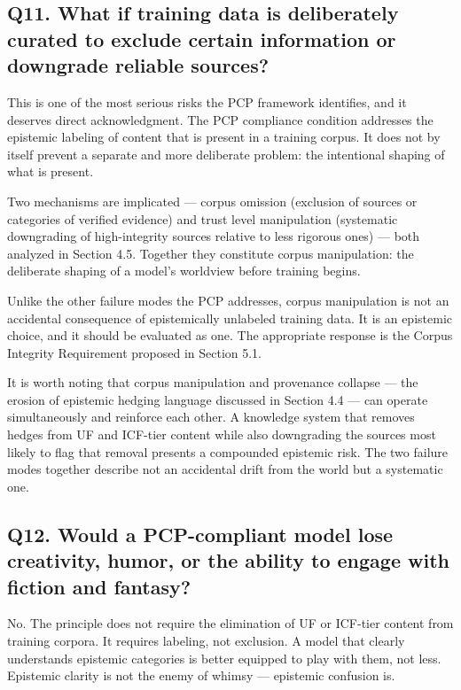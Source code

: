 \documentclass[12pt]{article}
\begin{document}
\subsection{Q11. What if training data is deliberately curated to
exclude certain information or downgrade reliable
sources?}\label{q11.-what-if-training-data-is-deliberately-curated-to-exclude-certain-information-or-downgrade-reliable-sources}

This is one of the most serious risks the PCP framework identifies, and
it deserves direct acknowledgment. The PCP compliance condition
addresses the epistemic labeling of content that is present in a
training corpus. It does not by itself prevent a separate and more
deliberate problem: the intentional shaping of what is present.

Two mechanisms are implicated --- corpus omission (exclusion of sources
or categories of verified evidence) and trust level manipulation
(systematic downgrading of high-integrity sources relative to less
rigorous ones) --- both analyzed in Section 4.5. Together they
constitute corpus manipulation: the deliberate shaping of a model's
worldview before training begins.

Unlike the other failure modes the PCP addresses, corpus manipulation is
not an accidental consequence of epistemically unlabeled training data.
It is an epistemic choice, and it should be evaluated as one. The
appropriate response is the Corpus Integrity Requirement proposed in
Section 5.1.

It is worth noting that corpus manipulation and provenance collapse ---
the erosion of epistemic hedging language discussed in Section 4.4 ---
can operate simultaneously and reinforce each other. A knowledge system
that removes hedges from UF and ICF-tier content while also downgrading
the sources most likely to flag that removal presents a compounded
epistemic risk. The two failure modes together describe not an
accidental drift from the world but a systematic one.

\subsection{Q12. Would a PCP-compliant model lose creativity, humor, or
the ability to engage with fiction and
fantasy?}\label{q12.-would-a-pcp-compliant-model-lose-creativity-humor-or-the-ability-to-engage-with-fiction-and-fantasy}

No. The principle does not require the elimination of UF or ICF-tier
content from training corpora. It requires labeling, not exclusion. A
model that clearly understands epistemic categories is better equipped
to play with them, not less. Epistemic clarity is not the enemy of
whimsy --- epistemic confusion is.
\end{document}
